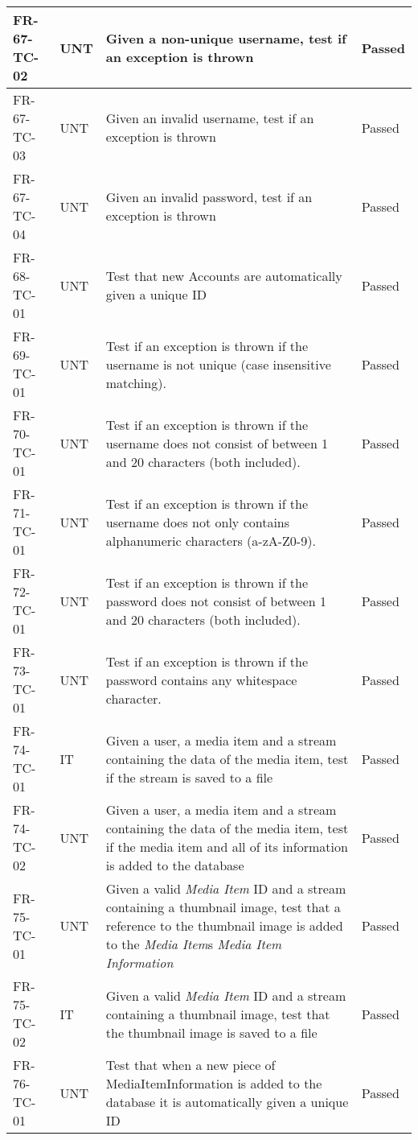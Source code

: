 \documentclass[../report.tex]{subfiles}
\begin{document}
\begin{longtable}{|L{2.1cm}|L{0.8cm}|L{9cm}|L{1.2cm}|}
FR-67-TC-02&UNT&Given a non-unique username, test if an exception is thrown&Passed  \\ \hline
FR-67-TC-03&UNT&Given an invalid username, test if an exception is thrown&Passed  \\ \hline
FR-67-TC-04&UNT&Given an invalid password, test if an exception is thrown&Passed  \\ \hline
FR-68-TC-01&UNT&Test that new Accounts are automatically given a unique ID&Passed  \\ \hline
FR-69-TC-01&UNT&Test if an exception is thrown if the username is not unique (case insensitive matching).&Passed  \\ \hline
FR-70-TC-01&UNT&Test if an exception is thrown if the username does not consist of between 1 and 20 characters (both included).&Passed  \\ \hline
FR-71-TC-01&UNT&Test if an exception is thrown if the username does not only contains alphanumeric characters (a-zA-Z0-9).&Passed  \\ \hline
FR-72-TC-01&UNT&Test if an exception is thrown if the password does not consist of between 1 and 20 characters (both included).&Passed  \\ \hline
FR-73-TC-01&UNT&Test if an exception is thrown if the password contains any whitespace character.&Passed  \\ \hline
FR-74-TC-01&IT&Given a user, a media item and a stream containing the data of the media item, test if the stream is saved to a file&Passed  \\ \hline
FR-74-TC-02&UNT&Given a user, a media item and a stream containing the data of the media item, test if the media item and all of its information is added to the database&Passed  \\ \hline
FR-75-TC-01 & UNT & Given a valid \textit{Media Item} ID and a stream containing a thumbnail image, test that a reference to the thumbnail image is added to the \textit{Media Item}s \textit{Media Item Information} & Passed  \\ \hline
FR-75-TC-02 & IT & Given a valid \textit{Media Item} ID and a stream containing a thumbnail image, test that the thumbnail image is saved to a file & Passed  \\ \hline
FR-76-TC-01&UNT&Test that when a new piece of MediaItemInformation is added to the database it is automatically given a unique ID&Passed  \\ \hline

\end{longtable}
\end{document}
